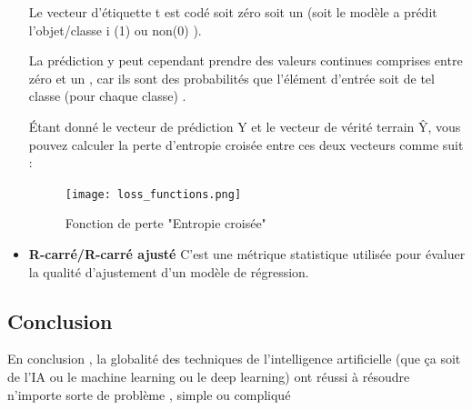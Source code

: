 \begin{itemize}[label=$\bullet$]
Le vecteur d'étiquette t est codé soit zéro soit un (soit le modèle a prédit l'objet/classe i (1) ou non(0) ).

La prédiction y peut cependant prendre des valeurs continues comprises entre zéro et un , car ils sont des probabilités que l'élément d'entrée soit de tel classe (pour chaque classe) .

Étant donné le vecteur de prédiction Y et le vecteur de vérité terrain Ŷ, vous pouvez calculer la perte d'entropie croisée entre ces deux vecteurs comme suit :

    \begin{figure}[htbp]
    \centering
    \texttt{[image: loss\_functions.png]}
    \caption{Fonction de perte "Entropie croisée"\cite{loss_functions}}
    \label{fig:example27}
    \end{figure}


\item \textbf{R-carré/R-carré ajusté}
C'est une métrique statistique utilisée pour évaluer la qualité d'ajustement d'un modèle de régression.
\end{itemize}
\subsection{Conclusion}
En conclusion , la globalité des techniques de l'intelligence artificielle (que ça soit de l'IA ou le machine learning ou le deep learning) ont réussi à résoudre n'importe sorte de problème , simple ou compliqué